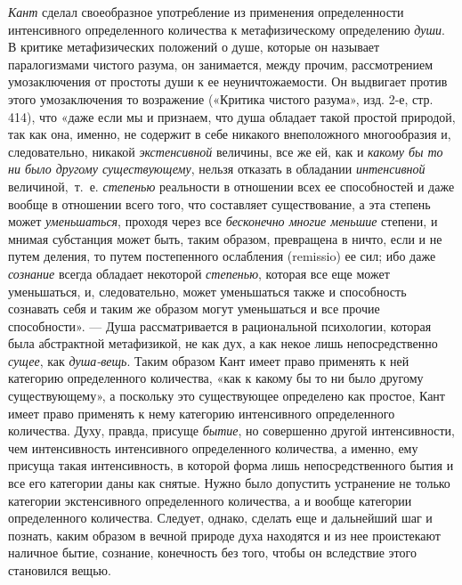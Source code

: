 {\em Кант} сделал своеобразное употребление из
применения определенности интенсивного определенного количества к
метафизическому определению {\em души}. В критике
метафизических положений о душе, которые он называет паралогизмами чистого
разума, он занимается, между прочим, рассмотрением умозаключения от
простоты души к ее неуничтожаемости. Он выдвигает против этого
умозаключения то возражение («Критика чистого разума», изд. 2-е, стр. 414),
что «даже если мы и признаем, что душа обладает такой простой природой, так
как она, именно, не содержит в себе никакого внеположного многообразия и,
следовательно, никакой {\em экстенсивной} величины, все
же ей, как и {\em какому бы то ни было другому
существующему}, нельзя отказать в обладании
{\em интенсивной} величиной,~т.~е.
{\em степенью} реальности в отношении всех ее
способностей и даже вообще в отношении всего того, что составляет
существование, а эта степень может {\em уменьшаться},
проходя через все {\em бесконечно многие меньшие}
степени, и мнимая субстанция может быть, таким образом, превращена в ничто,
если и не путем деления, то путем постепенного ослабления (remissio) ее
сил; ибо даже {\em сознание} всегда обладает некоторой
{\em степенью}, которая все еще может уменьшаться, и,
следовательно, может уменьшаться также и способность сознавать себя и таким
же образом могут уменьшаться и все прочие способности». — Душа
рассматривается в рациональной психологии, которая была абстрактной
метафизикой, не как дух, а как некое лишь непосредственно
{\em сущее}, как {\em душа-вещь}.
Таким образом Кант имеет право применять к ней категорию определенного
количества, «как к какому бы то ни было другому существующему», а поскольку
это существующее определено как простое, Кант имеет право применять к нему
категорию интенсивного определенного количества. Духу, правда, присуще
{\em бытие}, но совершенно другой интенсивности, чем
интенсивность интенсивного определенного количества, а именно, ему присуща
такая интенсивность, в которой форма лишь непосредственного бытия и все его
категории даны как снятые. Нужно было допустить устранение не только
категории экстенсивного определенного количества, а и вообще категории
определенного количества. Следует, однако, сделать еще и дальнейший шаг и
познать, каким образом в вечной природе духа находятся и из нее проистекают
наличное бытие, сознание, конечность без того, чтобы он вследствие этого
становился вещью.

